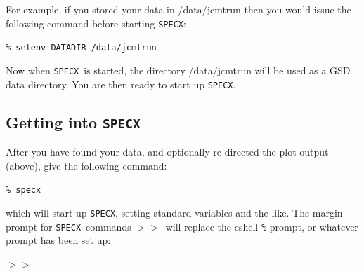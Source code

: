 \documentclass[11pt,twoside]{article}
\newcommand{\SPECX}{{\tt SPECX}}
\newcommand{\SP}{{$>\!>$}}
\begin{document}
For example, if you stored your data in /data/jcmtrun then you would issue the
following command before starting \SPECX:

\verb|% setenv DATADIR /data/jcmtrun|

Now when \SPECX\ is started, the directory /data/jcmtrun will be used as
a GSD data directory. You are then ready to start up \SPECX .

\subsection{Getting into \SPECX }
\label{sec:starting-specx}
After you have found your data, and optionally re-directed the plot
output (above), give the following command:

\verb|% specx|

which will start up \SPECX , setting standard variables and the
like. The margin prompt for \SPECX\ commands \SP\ will replace the cshell
{\tt \%} prompt, or whatever prompt has been set up:

\SP
\end{document}
